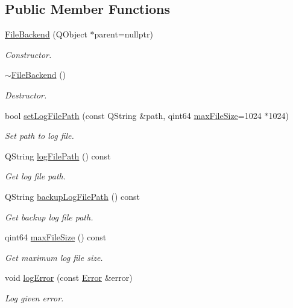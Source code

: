\subsection*{Public Member Functions}
\begin{DoxyCompactItemize}
\item 
\hyperlink{class_mdt_1_1_error_logger_1_1_file_backend_aac1230ca01a0aeb93731121ee4feaa3a}{File\+Backend} (Q\+Object $\ast$parent=nullptr)
\begin{DoxyCompactList}\small\item\em Constructor. \end{DoxyCompactList}\item 
\hyperlink{class_mdt_1_1_error_logger_1_1_file_backend_a5f7262e481d756d7145bbfa42aeca91e}{$\sim$\+File\+Backend} ()
\begin{DoxyCompactList}\small\item\em Destructor. \end{DoxyCompactList}\item 
bool \hyperlink{class_mdt_1_1_error_logger_1_1_file_backend_a844fc6f89a147b0713700028808e364a}{set\+Log\+File\+Path} (const Q\+String \&path, qint64 \hyperlink{class_mdt_1_1_error_logger_1_1_file_backend_a8c5943cdd59ed5941c72490d7b414359}{max\+File\+Size}=1024 $\ast$1024)
\begin{DoxyCompactList}\small\item\em Set path to log file. \end{DoxyCompactList}\item 
Q\+String \hyperlink{class_mdt_1_1_error_logger_1_1_file_backend_ac25cd41dbbe940bf0247e5054ce8805e}{log\+File\+Path} () const 
\begin{DoxyCompactList}\small\item\em Get log file path. \end{DoxyCompactList}\item 
Q\+String \hyperlink{class_mdt_1_1_error_logger_1_1_file_backend_a7c79c940be2f03f22111638d2e749a64}{backup\+Log\+File\+Path} () const 
\begin{DoxyCompactList}\small\item\em Get backup log file path. \end{DoxyCompactList}\item 
qint64 \hyperlink{class_mdt_1_1_error_logger_1_1_file_backend_a8c5943cdd59ed5941c72490d7b414359}{max\+File\+Size} () const 
\begin{DoxyCompactList}\small\item\em Get maximum log file size. \end{DoxyCompactList}\item 
void \hyperlink{class_mdt_1_1_error_logger_1_1_file_backend_a31b8314d523a491b5441276122daed87}{log\+Error} (const \hyperlink{class_mdt_1_1_error}{Error} \&error)
\begin{DoxyCompactList}\small\item\em Log given error. \end{DoxyCompactList}\end{DoxyCompactItemize}
